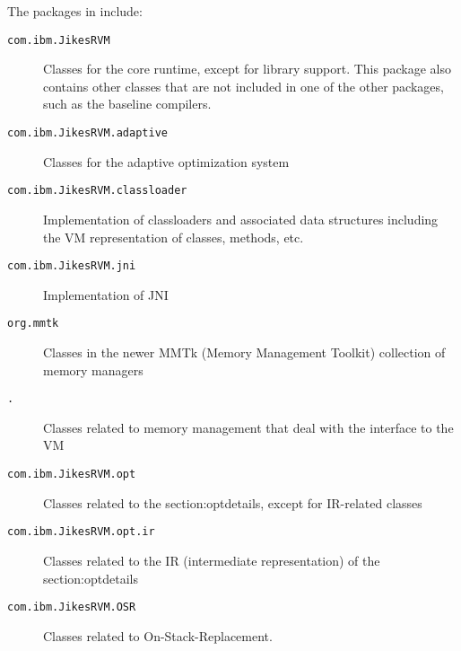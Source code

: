 The packages in \jrvm{} include:
\begin{description}
\item[\texttt{com.ibm.JikesRVM}] Classes for the core runtime, except for library
support.  This package also contains other classes that are not
included in one of the other packages, such as the baseline compilers. 

\item[\texttt{com.ibm.JikesRVM.adaptive}] Classes for the adaptive optimization system

\item[\texttt{com.ibm.JikesRVM.classloader}] Implementation of classloaders
and associated data structures including the VM representation of classes,
methods, etc. 

\item[\texttt{com.ibm.JikesRVM.jni}] Implementation of JNI

\item[\texttt{org.mmtk}] Classes in the newer MMTk
(Memory Management Toolkit) collection of memory managers

\item[\texttt{\MMpackage\-.\mmInterface{}}] Classes related to
memory management that deal with the interface to the VM

\item[\texttt{com.ibm.JikesRVM.opt}] Classes related to
the %
{section:optdetails}, except for IR-related classes

\item[\texttt{com.ibm.JikesRVM.opt.ir}] Classes related to the IR
(intermediate representation) of the %
{section:optdetails}

\item[\texttt{com.ibm.JikesRVM.OSR}] Classes related to On-Stack-Replacement. 


\end{description}
